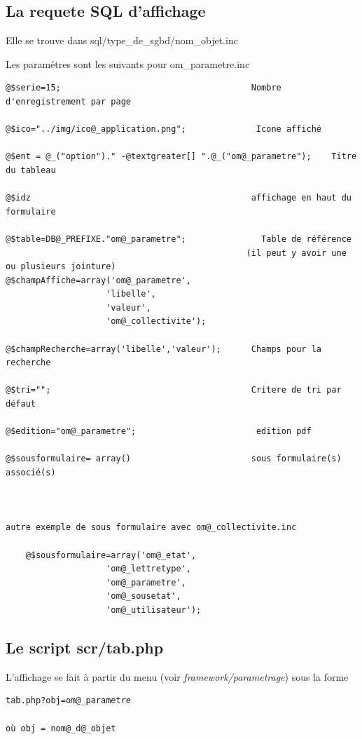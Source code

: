 \documentclass[letterpaper,10pt,french]{manual}
\begin{document}
\subsection{La requete SQL d'affichage}

Elle se trouve dans sql/type\_de\_sgbd/nom\_objet.inc

Les paramétres sont les suivants pour om\_parametre.inc

\begin{Verbatim}[commandchars=@\[\]]
@$serie=15;                                      Nombre d'enregistrement par page

@$ico="../img/ico@_application.png";              Icone affiché

@$ent = @_("option")." -@textgreater[] ".@_("om@_parametre");    Titre du tableau

@$idz                                            affichage en haut du formulaire

@$table=DB@_PREFIXE."om@_parametre";               Table de référence
                                                (il peut y avoir une ou plusieurs jointure)
@$champAffiche=array('om@_parametre',
                    'libelle',
                    'valeur',
                    'om@_collectivite');

@$champRecherche=array('libelle','valeur');      Champs pour la recherche

@$tri="";                                        Critere de tri par défaut

@$edition="om@_parametre";                        edition pdf

@$sousformulaire= array()                        sous formulaire(s) associé(s)



autre exemple de sous formulaire avec om@_collectivite.inc

    @$sousformulaire=array('om@_etat',
                    'om@_lettretype',
                    'om@_parametre',
                    'om@_sousetat',
                    'om@_utilisateur');
\end{Verbatim}


\subsection{Le script scr/tab.php}

L'affichage se fait à partir du menu (voir \emph{framework/parametrage}) sous la forme

\begin{Verbatim}[commandchars=@\[\]]
tab.php?obj=om@_parametre

où obj = nom@_d@_objet
\end{Verbatim}
\end{document}
